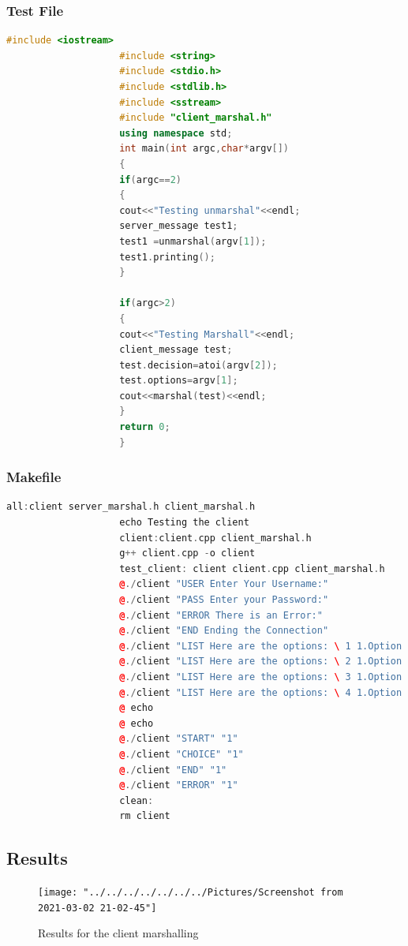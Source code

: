 \documentclass[11pt]{article}
\begin{document}
			\subsubsection{Test File}
				\begin{lstlisting}[language=C++]
					#include <iostream>
					#include <string>
					#include <stdio.h>
					#include <stdlib.h>
					#include <sstream>
					#include "client_marshal.h"
					using namespace std;
					int main(int argc,char*argv[])
					{
					if(argc==2)
					{
					cout<<"Testing unmarshal"<<endl;
					server_message test1;
					test1 =unmarshal(argv[1]);
					test1.printing();
					}
					
					if(argc>2)
					{
					cout<<"Testing Marshall"<<endl;
					client_message test;
					test.decision=atoi(argv[2]);
					test.options=argv[1];
					cout<<marshal(test)<<endl;
					}
					return 0;
					}
				\end{lstlisting}
			\subsubsection{Makefile}
				\begin{lstlisting}[language=C++]
					all:client server_marshal.h client_marshal.h
					echo Testing the client
					client:client.cpp client_marshal.h
					g++ client.cpp -o client				
					test_client: client client.cpp client_marshal.h
					@./client "USER Enter Your Username:"
					@./client "PASS Enter your Password:"
					@./client "ERROR There is an Error:"
					@./client "END Ending the Connection"
					@./client "LIST Here are the options: \ 1 1.Option 1 \\"
					@./client "LIST Here are the options: \ 2 1.Option 1 \ 2. Option 2 \\"
					@./client "LIST Here are the options: \ 3 1.Option 1 \ 2. Option 2 \ 3. Option 3 \\"
					@./client "LIST Here are the options: \ 4 1.Option 1 \ 2. Option 2 \ 3. Option 3 \ 4. Option 4 \\"
					@ echo
					@ echo
					@./client "START" "1"
					@./client "CHOICE" "1"
					@./client "END" "1"
					@./client "ERROR" "1"
					clean:
					rm client
				\end{lstlisting}
			\subsection{Results}	
					\begin{figure}[H]
						\centering
						\texttt{[image: "../../../../../../../Pictures/Screenshot from 2021-03-02 21-02-45"]}
						\caption{Results for the client marshalling}
						\label{fig:screenshot-from-2021-03-02-21-02-45}
					\end{figure}
\end{document}
